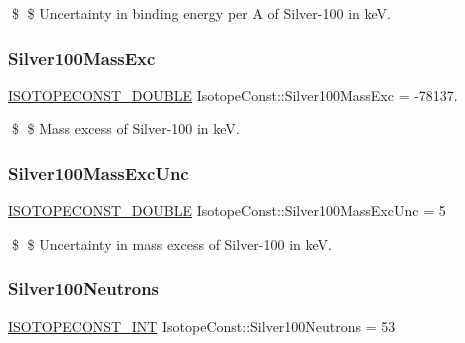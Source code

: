 \$ \$ Uncertainty in binding energy per A of Silver-\/100 in keV. \mbox{\label{group___isotope_const-_silver-_ag100_gaba231d6bb17c738f77d62e4e007d617d}} 
\subsubsection{\texorpdfstring{Silver100\+Mass\+Exc}{Silver100MassExc}}
{\footnotesize\ttfamily \mbox{\hyperlink{group___isotope_const-_macros_ga8f45a7272ce02c0b4c65c44636ed719a}{I\+S\+O\+T\+O\+P\+E\+C\+O\+N\+S\+T\+\_\+\+D\+O\+U\+B\+LE}} Isotope\+Const\+::\+Silver100\+Mass\+Exc = -\/78137.}

\$ \$ Mass excess of Silver-\/100 in keV. \mbox{\label{group___isotope_const-_silver-_ag100_ga8837d389743efccc1cad17598455c134}} 
\subsubsection{\texorpdfstring{Silver100\+Mass\+Exc\+Unc}{Silver100MassExcUnc}}
{\footnotesize\ttfamily \mbox{\hyperlink{group___isotope_const-_macros_ga8f45a7272ce02c0b4c65c44636ed719a}{I\+S\+O\+T\+O\+P\+E\+C\+O\+N\+S\+T\+\_\+\+D\+O\+U\+B\+LE}} Isotope\+Const\+::\+Silver100\+Mass\+Exc\+Unc = 5}

\$ \$ Uncertainty in mass excess of Silver-\/100 in keV. \mbox{\label{group___isotope_const-_silver-_ag100_gacbba9e66b3e98ec26f8a72794e8c8573}} 
\subsubsection{\texorpdfstring{Silver100\+Neutrons}{Silver100Neutrons}}
{\footnotesize\ttfamily \mbox{\hyperlink{group___isotope_const-_macros_ga5f18360b3e99483a35c32d789e62621c}{I\+S\+O\+T\+O\+P\+E\+C\+O\+N\+S\+T\+\_\+\+I\+NT}} Isotope\+Const\+::\+Silver100\+Neutrons = 53}

